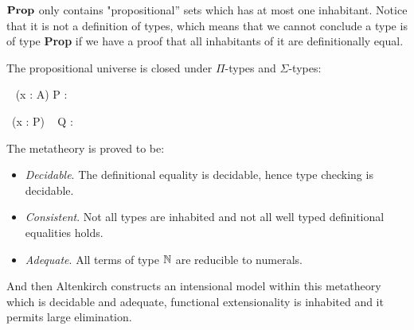 




 $\operatorname{\mathbf{Prop}}$ only contains "propositional'' sets which has at most one
inhabitant. Notice that it is not a definition of types, which means
that we cannot conclude a type is of type \textbf{Prop} if we have a
proof that all inhabitants of it are definitionally equal.

The propositional universe is closed under $\Pi$-types and $\Sigma$-types:



{\Gamma \vdash \Pi~ (x : A) \to P : \Prop}



{\Gamma \vdash \Sigma ~(x : P) ~ Q : \Prop}


The metatheory is proved {\cite{alti:lics99}} to be:

\begin{itemize}
\item \emph{Decidable}. The definitional equality is decidable, hence type checking is decidable.

\item \emph{Consistent}. Not all types are inhabited and not all well typed definitional equalities holds. 

\item \emph{Adequate}. All terms of type $\mathbb{N}$ are reducible to numerals.
\end{itemize}


And then Altenkirch constructs an intensional model within this metatheory which is decidable and adequate, functional extensionality is inhabited and it permits large elimination. 





